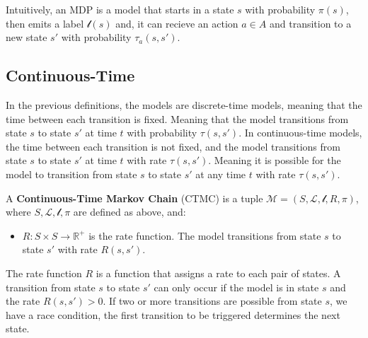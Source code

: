Intuitively, an MDP is a model that starts in a state $s$ with probability $\pi(s)$, then emits a label $\mathcal{l}(s)$ and, it can recieve an action $a \in A$ and transition to a new state $s'$ with probability $\tau_a(s, s')$. 

\subsection{Continuous-Time}
In the previous definitions, the models are discrete-time models, meaning that the time between each transition is fixed. Meaning that the model transitions from state $s$ to state $s'$ at time $t$ with probability $\tau(s, s')$. In continuous-time models, the time between each transition is not fixed, and the model transitions from state $s$ to state $s'$ at time $t$ with rate $\tau(s, s')$.
Meaning it is possible for the model to transition from state $s$ to state $s'$ at any time $t$ with rate $\tau(s, s')$.
\begin{definition}
    A \textbf{Continuous-Time Markov Chain} (CTMC) is a tuple $\mathcal{M} = (S, \mathcal{L}, \mathcal{l}, R, \pi)$, where $S, \mathcal{L}, \mathcal{l}, \pi$ are defined as above, and:
    \begin{itemize}
        \item $R: S \times S \rightarrow \mathbb{R}^+$ is the rate function. The model transitions from state $s$ to state $s'$ with rate $R(s, s')$.
    \end{itemize}
\end{definition}
The rate function $R$ is a function that assigns a rate to each pair of states. A transition from state $s$ to state $s'$ can only occur if the model is in state $s$ and the rate $R(s, s') > 0$. If two or more transitions are possible from state $s$, we have a race condition, the first transition to be triggered determines the next state.